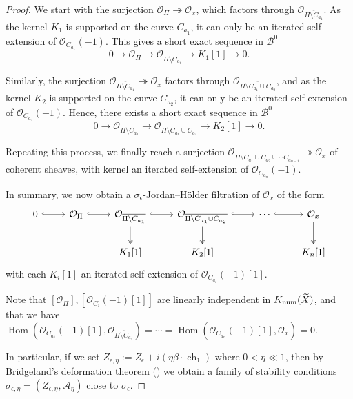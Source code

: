 \documentclass[12pt]{amsart}
\theoremstyle{definition}
\DeclareMathOperator{\Hom}{Hom}
\DeclareMathOperator{\num}{num}
\DeclareMathOperator{\ch}{ch}
\begin{document}
\begin{proof}
We start with the surjection $\mathcal{O}_{\Pi} \twoheadrightarrow \mathcal{O}_x$,
which factors through $\mathcal{O}_{\overline{\Pi\setminus C_{a_1}}}$.
As the kernel $K_1$ is supported on the curve $C_{a_1}$,
it can only be an iterated self-extension of $\mathcal{O}_{C_{a_1}}(-1)$.
This gives a short exact sequence in $\mathcal{B}^0$
\[0\longrightarrow \mathcal{O}_{\Pi} \longrightarrow \mathcal{O}_{\overline{\Pi\setminus C_{a_1}}}\longrightarrow K_1[1] \longrightarrow 0.\]

Similarly, the surjection $\mathcal{O}_{\overline{\Pi\setminus C_{a_1}}} \twoheadrightarrow \mathcal{O}_x$ factors through $\mathcal{O}_{\overline{\Pi\setminus C_{a_1}\cup C_{a_2}}}$,
and as the kernel $K_2$ is supported on the curve $C_{a_2}$, 
it can only be an iterated self-extension of $\mathcal{O}_{C_{a_2}}(-1)$.
Hence, there exists a short exact sequence in
$\mathcal{B}^0$
\[0\longrightarrow \mathcal{O}_{\overline{\Pi\setminus C_{a_1}}}\longrightarrow \mathcal{O}_{\overline{\Pi\setminus C_{a_1}\cup C_{a_2}}} \longrightarrow K_2[1] \longrightarrow 0.\]

Repeating this process, we finally reach a surjection $\mathcal{O}_{\overline{\Pi\setminus C_{a_1}\cup C_{a_2}\cup\cdots C_{a_{n-1}}}} \twoheadrightarrow \mathcal{O}_x$ of coherent sheaves,
with kernel an iterated self-extension of $\mathcal{O}_{C_{a_n}}(-1)$.

In summary, we now obtain a $\sigma_\epsilon$-Jordan--Hölder filtration of $\mathcal{O}_x$ of the form
\[
\begin{tikzcd}
0 \arrow[r, hook] & \mathcal{O}_{\Pi} \arrow[r, hook] & \mathcal{O}_{\overline{\Pi\setminus C_{a_1}}} \arrow[r, hook] \arrow[d, two heads] & \mathcal{O}_{\overline{\Pi\setminus C_{a_1}\cup C_{a_2}}} \arrow[r, hook] \arrow[d, two heads] & \cdots \arrow[r, hook] & \mathcal{O}_x \arrow[d, two heads] \\
&     & K_1[1]          & K_2[1]                       &     & K_n[1]             
\end{tikzcd}
\]
with each $K_i[1]$ an iterated self-extension of $\mathcal{O}_{C_{a_i}}(-1)[1]$.

Note that $[\mathcal{O}_{\Pi}],[\mathcal{O}_{C_i}(-1)[1]]$ are linearly independent in ${\rm K}_{\num}(\widetilde{X})$,
and that we have $\Hom(\mathcal{O}_{C_{a_1}}(-1)[1],\mathcal{O}_{\overline{\Pi\setminus C_{a_1}}})= \cdots =\Hom(\mathcal{O}_{C_{a_n}}(-1)[1],\mathcal{O}_x)= 0$.

In particular, if we set $Z_{\epsilon,\eta}:= Z_\epsilon +i (\eta \beta \cdot \ch_1)$ where $0<\eta\ll1$,
then by Bridgeland's deformation theorem (\cite[Theorem 1.2]{Bri07}) we obtain a family of stability conditions $\sigma_{\epsilon,\eta}=(Z_{\epsilon,\eta},\mathcal{A}_\eta)$ close to $\sigma_\epsilon$.


\end{proof}
\end{document}
